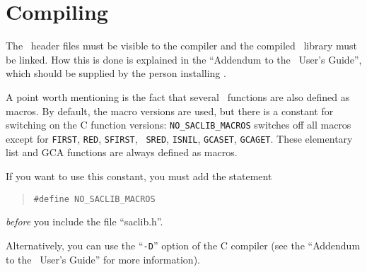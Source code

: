 \section{Compiling}
\label{c:CFC s:C}

The \saclib\ header files must be visible to the compiler and the compiled
\saclib\ library must be linked. How this is done is explained in the
``Addendum to the \saclib\ User's Guide'', which should be supplied by the
person installing \saclib.

A point worth mentioning is the fact that several \saclib\ functions are also
defined as macros. By default, the macro versions are used, but there is a
constant for switching on the C function versions: {\tt NO\_SACLIB\_MACROS}
switches off all macros except for {\tt FIRST}, {\tt RED}, {\tt SFIRST}, {\tt
SRED}, {\tt ISNIL}, {\tt GCASET}, {\tt GCAGET}.  These elementary list and GCA
functions are always defined as macros.

If you want to use this constant, you must add the statement
\begin{quote}
\tt \#define NO\_SACLIB\_MACROS
\end{quote}
{\em before} you include the file ``saclib.h''.

Alternatively, you can use the ``{\tt -D}'' option of the C compiler (see
the ``Addendum to the \saclib\ User's Guide'' for more information).
